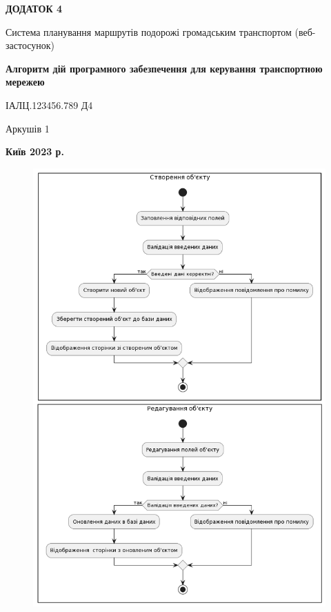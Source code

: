 \clearpage
\begin{center}
{\fontsize{18}{22}\selectfont
\textbf{\uppercase{Додаток 4}}
}

{\fontsize{16}{29}\selectfont
\bigbreak
\bigbreak
Система планування маршрутів подорожі громадським транспортом (веб-
застосунок)
}

\vspace*{\fill}

{\fontsize{18}{22}\selectfont
\textbf{Алгоритм дій програмного забезпечення для керування транспортною мережею}

ІАЛЦ.123456.789 Д4
}

\vfill

{\fontsize{16}{29}\selectfont
Аркушів 1
}
\vfill %

\textbf{Київ 2023 р.}
\end{center}
\clearpage

\vspace*{\fill}
\begin{figure}[!htp]
    \centering
    \includegraphics[scale=0.55]{content/applications/assets/img/route_management_diagram.png}
    \label{fig:app-1}
\end{figure}
\vfill